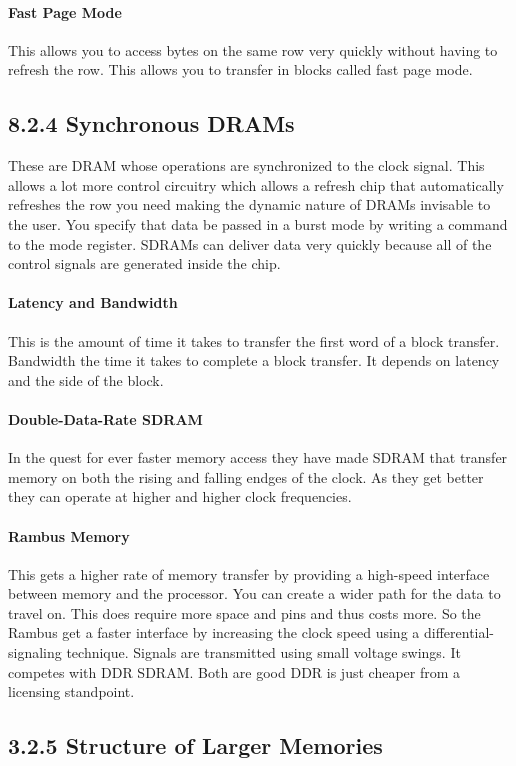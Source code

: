 \documentclass[12pt]{article}
\begin{document}
\paragraph*{Fast Page Mode}
This allows you to access bytes on the same row very quickly without having to refresh the row. This allows you to transfer in blocks called fast page mode.  
\subsection*{8.2.4 Synchronous DRAMs}
These are DRAM whose operations are synchronized to the clock signal. This allows a lot more control circuitry which allows a refresh chip that automatically refreshes the row you need making the dynamic nature of DRAMs invisable to the user. You specify that data be passed in a burst mode by writing a command to the mode register. SDRAMs can deliver data very quickly because all of the control signals are generated inside the chip. 
\paragraph*{Latency and Bandwidth}
This is the amount of time it takes to transfer the first word of a block transfer. Bandwidth the time it takes to complete a block transfer. It depends on latency and the side of the block.
\paragraph*{Double-Data-Rate SDRAM}
In the quest for ever faster memory access they have made SDRAM that transfer memory on both the rising and falling endges of the clock. As they get better they can operate at higher and higher clock frequencies.
\paragraph*{Rambus Memory}
This gets a higher rate of memory transfer by providing a high-speed interface between memory and the processor. You can create a wider path for the data to travel on. This does require more space and pins and thus costs more. So the Rambus get a faster interface by increasing the clock speed using a differential-signaling technique. Signals are transmitted using small voltage swings. It competes with DDR SDRAM. Both are good DDR is just cheaper from a licensing standpoint.
\subsection*{3.2.5 Structure of Larger Memories}
\end{document}
